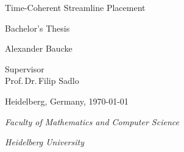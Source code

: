 
\begin{titlepage}
  \centering %
  \vspace*{\baselineskip} %


  {\huge Time-Coherent Streamline Placement}\\[0.2\baselineskip] %


  \vspace*{\baselineskip}

  {\Large Bachelor's Thesis\\[\baselineskip]} %
  \vspace*{\baselineskip}

  {\LARGE Alexander Baucke\\[\baselineskip]} %

  \vspace*{\baselineskip} %

  Supervisor\\
  {\large  Prof.\,Dr.\,Filip Sadlo\\[\baselineskip]} %

  \vfil

  Heidelberg, Germany,  \today \par %

  \vspace*{\baselineskip}

  {\itshape Faculty of Mathematics and Computer Science\par} %
  {\itshape Heidelberg University\par} %
\end{titlepage}

\cleardoublepage
